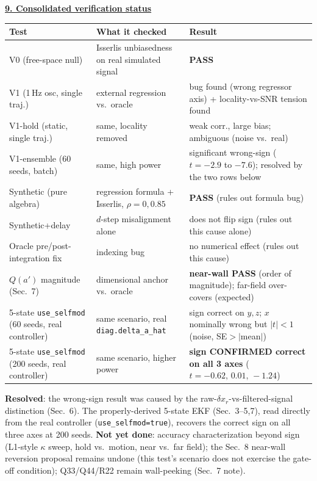 \documentclass[11pt,a4paper,fontset=none]{ctexart}
\newcommand{\dxr}{\delta x_r}
\newcommand{\hd}[1]{\par\medskip\noindent\underline{\textbf{#1}}\par\nobreak\vspace{0.3ex}}
\begin{document}
\newpage
\hd{9. Consolidated verification status}
\begin{center}\small
\begin{tabular}{@{}p{3.6cm}p{6.2cm}p{5.2cm}@{}}
\toprule
Test & What it checked & Result \\
\midrule
V0 (free-space null) & Isserlis unbiasedness on real simulated signal & \textbf{PASS} \\
V1 (1\,Hz osc, single traj.) & external regression vs.\ oracle & bug found (wrong regressor axis) + locality-vs-SNR tension found \\
V1-hold (static, single traj.) & same, locality removed & weak corr., large bias; ambiguous (noise vs.\ real) \\
V1-ensemble (60 seeds, batch) & same, high power & significant wrong-sign ($t=-2.9$ to $-7.6$); resolved by the two rows below \\
Synthetic (pure algebra) & regression formula + Isserlis, $\rho{=}0,0.85$ & \textbf{PASS} (rules out formula bug) \\
Synthetic+delay & $d$-step misalignment alone & does not flip sign (rules out this cause alone) \\
Oracle pre/post-integration fix & indexing bug & no numerical effect (rules out this cause) \\
$Q(a')$ magnitude (Sec.~7) & dimensional anchor vs.\ oracle & \textbf{near-wall PASS} (order of magnitude); far-field over-covers (expected) \\
5-state \texttt{use\_selfmod} (60 seeds, real controller) & same scenario, real \texttt{diag.delta\_a\_hat} & sign correct on $y,z$; $x$ nominally wrong but $|t|<1$ (noise, SE$>|$mean$|$) \\
5-state \texttt{use\_selfmod} (200 seeds, real controller) & same scenario, higher power & \textbf{sign CONFIRMED correct on all 3 axes} ($t=-0.62,\,0.01,\,-1.24$) \\
\bottomrule
\end{tabular}
\end{center}
\textbf{Resolved}: the wrong-sign result was caused by the raw-$\dxr$-vs-filtered-signal distinction (Sec.~6). The properly-derived 5-state EKF (Sec.~3--5,7), read directly from the real controller (\texttt{use\_selfmod=true}), recovers the correct sign on all three axes at 200 seeds. \textbf{Not yet done}: accuracy characterization beyond sign (L1-style $\kappa$ sweep, hold vs.\ motion, near vs.\ far field); the Sec.~8 near-wall reversion proposal remains undone (this test's scenario does not exercise the gate-off condition); Q33/Q44/R22 remain wall-peeking (Sec.~7 note).
\end{document}
